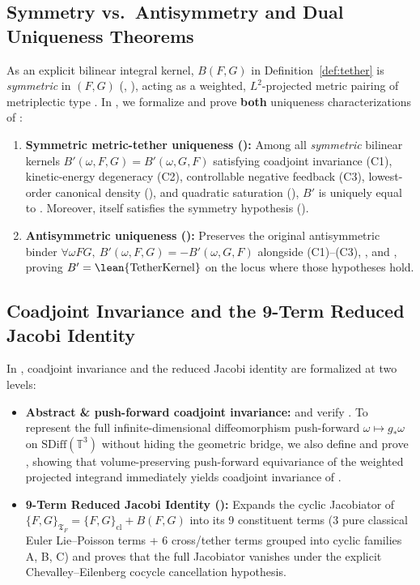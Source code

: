 \documentclass[11pt,a4paper]{article}
\theoremstyle{plain}
\theoremstyle{definition}
\theoremstyle{remark}
\newcommand{\T}{\mathbb{T}^3}
\newcommand{\Tf}{\mathfrak{T}_F}
\begin{document}
\subsection{Symmetry vs.\ Antisymmetry and Dual Uniqueness Theorems}
As an explicit bilinear integral kernel, $B(F,G)$ in Definition~\ref{def:tether} is \emph{symmetric} in $(F,G)$ (, ), acting as a weighted, $L^2$-projected metric pairing of metriplectic type \cite{Morrison1986}. In , we formalize and prove \textbf{both} uniqueness characterizations of :
\begin{enumerate}
\item \textbf{Symmetric metric-tether uniqueness ():} Among all \emph{symmetric} bilinear kernels $B'(\omega,F,G)=B'(\omega,G,F)$ satisfying coadjoint invariance (C1), kinetic-energy degeneracy (C2), controllable negative feedback (C3), lowest-order canonical density (), and quadratic saturation (), $B'$ is uniquely equal to . Moreover,  itself satisfies the symmetry hypothesis ().
\item \textbf{Antisymmetric uniqueness ():} Preserves the original antisymmetric binder $\forall\omega F G,\ B'(\omega,F,G)=-B'(\omega,G,F)$ alongside (C1)--(C3), , and , proving $B'=\text{\lean{TetherKernel}}$ on the locus where those hypotheses hold.
\end{enumerate}

\subsection{Coadjoint Invariance and the 9-Term Reduced Jacobi Identity}
In , coadjoint invariance and the reduced Jacobi identity are formalized at two levels:
\begin{itemize}
\item \textbf{Abstract \& push-forward coadjoint invariance:}  and  verify . To represent the full infinite-dimensional diffeomorphism push-forward $\omega\mapsto g_*\omega$ on $\mathrm{SDiff}(\T)$ without hiding the geometric bridge, we also define  and prove , showing that volume-preserving push-forward equivariance of the weighted projected integrand immediately yields coadjoint invariance of .
\item \textbf{9-Term Reduced Jacobi Identity ():} Expands the cyclic Jacobiator of $\{F,G\}_{\Tf}=\{F,G\}_{\mathrm{cl}}+B(F,G)$ into its 9 constituent terms (3 pure classical Euler Lie--Poisson terms + 6 cross/tether terms grouped into cyclic families A, B, C) and proves that the full Jacobiator vanishes under the explicit Chevalley--Eilenberg cocycle cancellation hypothesis.
\end{itemize}
\end{document}
